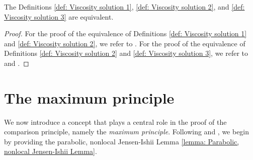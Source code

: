 \begin{proposition} 
\label{prop: Propositions 5.4 and 5.6 in Seydel}
    The Definitions \ref{def: Viscosity solution 1}, \ref{def: Viscosity solution 2}, and \ref{def: Viscosity solution 3} are equivalent. 
\end{proposition}
\begin{proof}
    For the proof of the equivalence of Definitions \ref{def: Viscosity solution 1} and \ref{def: Viscosity solution 2}, we refer to {\cite[Proposition 5.4]{seydel2010generalexistenceuniquenessviscosity}}. For the proof of the equivalence of Definitions \ref{def: Viscosity solution 2} and \ref{def: Viscosity solution 3}, we refer to {\cite[Proposition 5.6]{seydel2010generalexistenceuniquenessviscosity}} and \cite{barles2008second}.
\end{proof}

\section{The maximum principle}
\label{section: Maximum Principle}
We now introduce a concept that plays a central role in the proof of the comparison principle, namely the \emph{maximum principle}. Following \textcite{barles2008second} and \textcite{seydel2010generalexistenceuniquenessviscosity}, we begin by providing the parabolic, nonlocal Jensen-Ishii Lemma \ref{lemma: Parabolic, nonlocal Jensen-Ishii Lemma}. 

